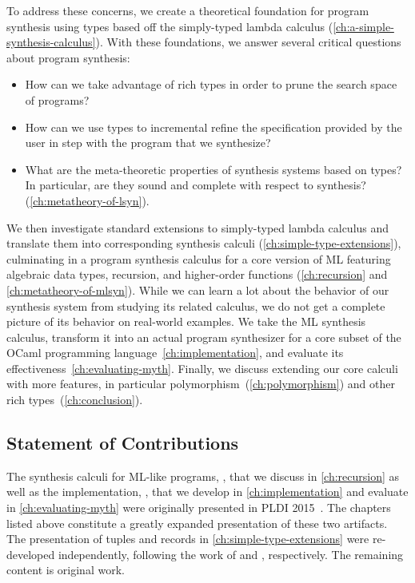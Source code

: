 To address these concerns, we create a theoretical foundation for program synthesis using types based off the simply-typed lambda calculus (\autoref{ch:a-simple-synthesis-calculus}).
With these foundations, we answer several critical questions about program synthesis:
\begin{itemize}
  \item How can we take advantage of rich types in order to prune the search space of programs?
  \item How can we use types to incremental refine the specification provided by the user in step with the program that we synthesize?
  \item What are the meta-theoretic properties of synthesis systems based on types?  In particular, are they sound and complete with respect to synthesis? (\autoref{ch:metatheory-of-lsyn}).
\end{itemize}
We then investigate standard extensions to simply-typed lambda calculus and translate them into corresponding synthesis calculi (\autoref{ch:simple-type-extensions}), culminating in a program synthesis calculus for a core version of ML featuring algebraic data types, recursion, and higher-order functions (\autoref{ch:recursion} and \autoref{ch:metatheory-of-mlsyn}).
While we can learn a lot about the behavior of our synthesis system from studying its related calculus, we do not get a complete picture of its behavior on real-world examples.
We take the ML synthesis calculus, transform it into an actual program synthesizer for a core subset of the OCaml programming language~\autoref{ch:implementation}, and evaluate its effectiveness~\autoref{ch:evaluating-myth}.
Finally, we discuss extending our core calculi with more features, in particular polymorphism~(\autoref{ch:polymorphism}) and other rich types~(\autoref{ch:conclusion}).

\subsection{Statement of Contributions}

The synthesis calculi for ML-like programs, \mlsyn{}, that we discuss in \autoref{ch:recursion} as well as the implementation, \myth{}, that we develop in \autoref{ch:implementation} and evaluate in \autoref{ch:evaluating-myth} were originally presented in {PLDI} 2015~\citep{osera-pldi-2015}.
The chapters listed above constitute a greatly expanded presentation of these two artifacts.
The presentation of tuples and records in \autoref{ch:simple-type-extensions} were re-developed independently, following the work of \citet{frankle-mastersthesis-2015} and \citet{shah-mastersthesis-2015}, respectively.
The remaining content is original work.
